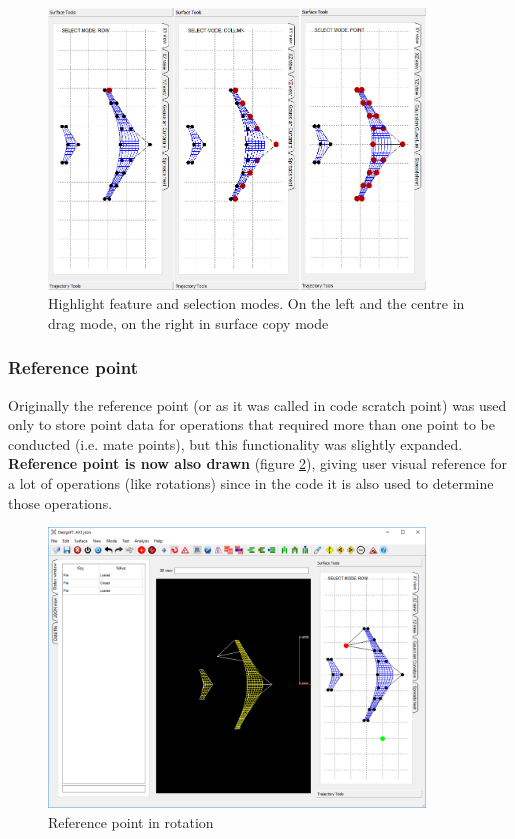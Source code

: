 \documentclass[a4paper, 11pt, article]{report}
\begin{document}
\begin{figure}[!h]
	\centering
	
	\includegraphics[width=10cm]{images/highlight_feature.png}
	
	\caption{Highlight feature and selection modes. On the left and the centre in drag mode, on the right in surface copy mode}
	
	\label{highlight_selection}
\end{figure}

\subsubsection{Reference point}

Originally the reference point (or as it was called in code scratch point) was used only to store point data for operations that required more than one point to be conducted (i.e. mate points), but this functionality was slightly expanded. \textbf{Reference point is now also drawn} (figure \ref{Reference}), giving user visual reference for a lot of operations (like rotations) since in the code it is also used to determine those operations.

\begin{figure}[!h]
	\centering
	
	\includegraphics[width=10cm]{images/reference_point.png}
	
	\caption{Reference point in rotation}
	
	\label{Reference}
\end{figure}
\end{document}

